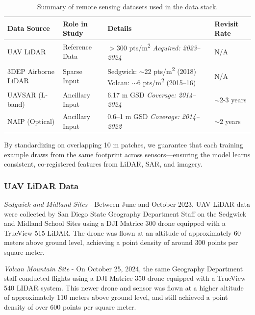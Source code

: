 \documentclass[remotesensing,article,submit,pdftex,moreauthors]{Definitions/mdpi}
\begin{document}
\begin{table}[H] %
\centering
\caption{Summary of remote sensing datasets used in the data stack.}
\label{tab:data_summary}
\begin{tabular}{l l p{4.5cm} l}
\toprule
\textbf{Data Source} & \textbf{Role in Study} & \textbf{Details} & \textbf{Revisit Rate} \\
\midrule
UAV LiDAR & Reference Data & $>$300 pts/m\textsuperscript{2} \newline \textit{Acquired: 2023--2024} & N/A \\
\addlinespace %
3DEP Airborne LiDAR & Sparse Input & Sedgwick: $\sim$22 pts/m\textsuperscript{2} (2018) \newline Volcan: $\sim$6 pts/m\textsuperscript{2} (2015–16) & N/A \\
\addlinespace
UAVSAR (L-band) & Ancillary Input & 6.17 m GSD \newline \textit{Coverage: 2014--2024} & $\sim$2-3 years \\
\addlinespace
NAIP (Optical) & Ancillary Input & 0.6–1 m GSD \newline \textit{Coverage: 2014--2022} & $\sim$2 years \\
\bottomrule
\end{tabular}
\end{table}

By standardizing on overlapping 10 m patches, we guarantee that each training example draws from the same footprint across sensors—ensuring the model learns consistent, co-registered features from LiDAR, SAR, and imagery.

\subsubsection{UAV LiDAR Data}
\textit{Sedgwick and Midland Sites} - Between June and October 2023, UAV LiDAR data were collected by San Diego State Geography Department Staff on the Sedgwick and Midland School Sites using a DJI Matrice 300 drone equipped with a TrueView 515 LiDAR. The drone was flown at an altitude of approximately 60 meters above ground level, achieving a point density of around 300 points per square meter.

\textit{Volcan Mountain Site} - On October 25, 2024, the same Geography Department staff conducted flights using a  DJI Matrice 350 drone equipped with a TrueView 540 LIDAR system. This newer drone and sensor was flown at a higher altitude of approximately 110 meters above ground level, and still achieved a point density of over 600 points per square meter.
\end{document}
